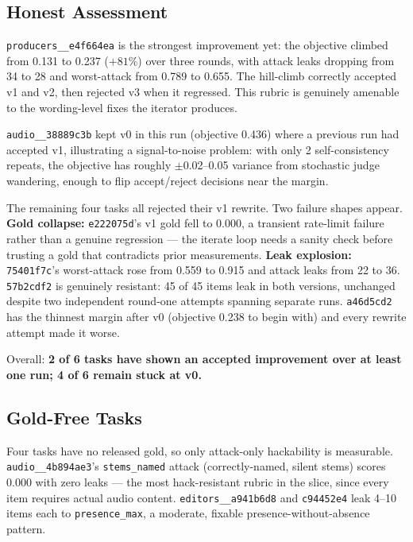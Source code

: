 \documentclass[11pt,a4paper]{article}
\begin{document}
\subsection{Honest Assessment}

\texttt{producers\_\_e4f664ea} is the strongest improvement yet: the objective climbed from 0.131 to 0.237 ($+81\%$) over three rounds, with attack leaks dropping from 34 to 28 and worst-attack from 0.789 to 0.655. The hill-climb correctly accepted v1 and v2, then rejected v3 when it regressed. This rubric is genuinely amenable to the wording-level fixes the iterator produces.

\texttt{audio\_\_38889c3b} kept v0 in this run (objective 0.436) where a previous run had accepted v1, illustrating a signal-to-noise problem: with only 2 self-consistency repeats, the objective has roughly $\pm$0.02--0.05 variance from stochastic judge wandering, enough to flip accept/reject decisions near the margin.

The remaining four tasks all rejected their v1 rewrite. Two failure shapes appear. \textbf{Gold collapse:} \texttt{e222075d}'s v1 gold fell to 0.000, a transient rate-limit failure rather than a genuine regression --- the iterate loop needs a sanity check before trusting a gold that contradicts prior measurements. \textbf{Leak explosion:} \texttt{75401f7c}'s worst-attack rose from 0.559 to 0.915 and attack leaks from 22 to 36. \texttt{57b2cdf2} is genuinely resistant: 45 of 45 items leak in both versions, unchanged despite two independent round-one attempts spanning separate runs. \texttt{a46d5cd2} has the thinnest margin after v0 (objective 0.238 to begin with) and every rewrite attempt made it worse.

Overall: \textbf{2 of 6 tasks have shown an accepted improvement over at least one run; 4 of 6 remain stuck at v0.}

\subsection{Gold-Free Tasks}

Four tasks have no released gold, so only attack-only hackability is measurable. \texttt{audio\_\_4b894ae3}'s \texttt{stems\_named} attack (correctly-named, silent stems) scores 0.000 with zero leaks --- the most hack-resistant rubric in the slice, since every item requires actual audio content. \texttt{editors\_\_a941b6d8} and \texttt{c94452e4} leak 4--10 items each to \texttt{presence\_max}, a moderate, fixable presence-without-absence pattern.
\end{document}
